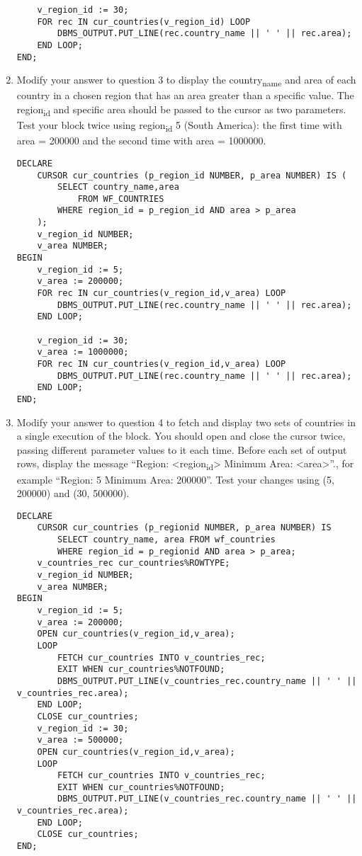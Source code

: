 \documentclass[11pt]{article}
\begin{document}
\begin{enumerate}
\begin{verbatim}
    v_region_id := 30;
    FOR rec IN cur_countries(v_region_id) LOOP
        DBMS_OUTPUT.PUT_LINE(rec.country_name || ' ' || rec.area);
    END LOOP;
END;
\end{verbatim}

\item Modify your answer to question 3 to display the country\textsubscript{name} and area of each country in a chosen region that has an area greater than a specific value. The region\textsubscript{id} and specific area should be passed to the cursor as two parameters. Test your block twice using region\textsubscript{id} 5 (South America): the first time with area = 200000 and the second time with area = 1000000.
\begin{verbatim}
DECLARE
    CURSOR cur_countries (p_region_id NUMBER, p_area NUMBER) IS (
        SELECT country_name,area
            FROM WF_COUNTRIES
        WHERE region_id = p_region_id AND area > p_area
    );
    v_region_id NUMBER;
    v_area NUMBER;
BEGIN
    v_region_id := 5;
    v_area := 200000;
    FOR rec IN cur_countries(v_region_id,v_area) LOOP
        DBMS_OUTPUT.PUT_LINE(rec.country_name || ' ' || rec.area);
    END LOOP;

    v_region_id := 30;
    v_area := 1000000;
    FOR rec IN cur_countries(v_region_id,v_area) LOOP
        DBMS_OUTPUT.PUT_LINE(rec.country_name || ' ' || rec.area);
    END LOOP;
END;
\end{verbatim}

\item Modify your answer to question 4 to fetch and display two sets of countries in a single execution of the block. You should open and close the cursor twice, passing different parameter values to it each time. Before each set of output rows, display the message “Region: <region\textsubscript{id}> Minimum Area: <area>”., for example “Region: 5 Minimum Area: 200000”. Test your changes using (5, 200000) and (30, 500000).
\begin{verbatim}
DECLARE
    CURSOR cur_countries (p_regionid NUMBER, p_area NUMBER) IS
        SELECT country_name, area FROM wf_countries
        WHERE region_id = p_regionid AND area > p_area;
    v_countries_rec cur_countries%ROWTYPE;
    v_region_id NUMBER;
    v_area NUMBER;
BEGIN
    v_region_id := 5;
    v_area := 200000;
    OPEN cur_countries(v_region_id,v_area);
    LOOP
        FETCH cur_countries INTO v_countries_rec;
        EXIT WHEN cur_countries%NOTFOUND;
        DBMS_OUTPUT.PUT_LINE(v_countries_rec.country_name || ' ' || v_countries_rec.area);
    END LOOP;
    CLOSE cur_countries;
    v_region_id := 30;
    v_area := 500000;
    OPEN cur_countries(v_region_id,v_area);
    LOOP
        FETCH cur_countries INTO v_countries_rec;
        EXIT WHEN cur_countries%NOTFOUND;
        DBMS_OUTPUT.PUT_LINE(v_countries_rec.country_name || ' ' || v_countries_rec.area);
    END LOOP;
    CLOSE cur_countries;
END;
\end{verbatim}
\end{enumerate}
\end{document}
